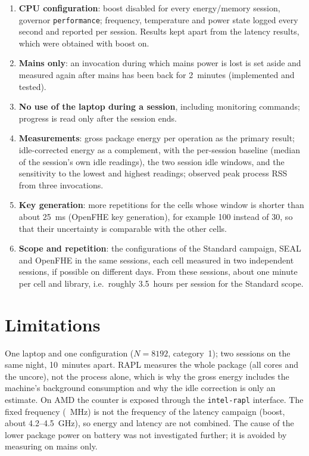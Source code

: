 \documentclass[11pt]{article}
\begin{document}
\begin{enumerate}[leftmargin=*, itemsep=2pt]
  \item \textbf{CPU configuration}: boost disabled for every energy/memory session, governor \texttt{performance}; frequency, temperature and power state logged every second and reported per session. Results kept apart from the latency results, which were obtained with boost on.
  \item \textbf{Mains only}: an invocation during which mains power is lost is set aside and measured again after mains has been back for 2~minutes (implemented and tested).
  \item \textbf{No use of the laptop during a session}, including monitoring commands; progress is read only after the session ends.
  \item \textbf{Measurements}: gross package energy per operation as the primary result; idle-corrected energy as a complement, with the per-session baseline (median of the session's own idle readings), the two session idle windows, and the sensitivity to the lowest and highest readings; observed peak process RSS from three invocations.
  \item \textbf{Key generation}: more repetitions for the cells whose window is shorter than about 25~ms (OpenFHE key generation), for example 100 instead of 30, so that their uncertainty is comparable with the other cells.
  \item \textbf{Scope and repetition}: the configurations of the Standard campaign, SEAL and OpenFHE in the same sessions, each cell measured in two independent sessions, if possible on different days. From these sessions, about one minute per cell and library, i.e.\ roughly 3.5~hours per session for the Standard scope.
\end{enumerate}

\section{Limitations}

One laptop and one configuration ($N=8192$, category~1); two sessions on the same night, 10~minutes apart. RAPL measures the whole package (all cores and the uncore), not the process alone, which is why the gross energy includes the machine's background consumption and why the idle correction is only an estimate. On AMD the counter is exposed through the \texttt{intel-rapl} interface. The fixed frequency (\freqAMains~MHz) is not the frequency of the latency campaign (boost, about 4.2--4.5~GHz), so energy and latency are not combined. The cause of the lower package power on battery was not investigated further; it is avoided by measuring on mains only.
\end{document}
